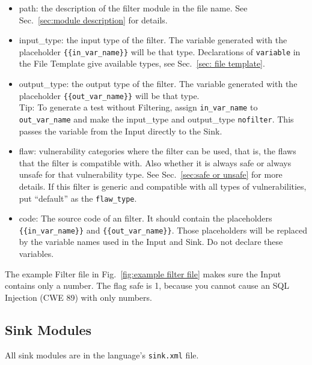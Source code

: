 \documentclass[12pt]{article}
\begin{document}
\begin{itemize}
    \item path: the description of the filter module in the file name.
      See Sec.~\ref{sec:module description} for details.
    
    \item input\_type: the input type of the filter. The variable 
    generated with
    the placeholder \verb|{{in_var_name}}| will be that type.
    Declarations of \verb|variable| in the File Template give
    available types, see Sec.~\ref{sec: file template}.

    \item output\_type: the output type of the filter.  The variable generated
    with the placeholder \verb|{{out_var_name}}| will be that type. \\
    Tip: To generate a test without Filtering, assign \verb|in_var_name| to
    \verb|out_var_name| and make the input\_type and output\_type \verb|nofilter|.
    This passes the variable from the Input directly to the Sink.

    \item flaw: vulnerability categories where the filter can be used, that is, the
      flaws that the filter is compatible with.  Also whether it is always safe or
      always unsafe for that vulnerability type.  See Sec.~\ref{sec:safe or unsafe}
      for more details.  If this filter is generic and compatible with all
      types of vulnerabilities, put ``default'' as the \verb|flaw_type|.

    \item code: The source code of an filter. It should contain the placeholders
    \\
    \verb|{{in_var_name}}| and \verb|{{out_var_name}}|.  Those placeholders will 
    be replaced by the variable names used in the Input and Sink.  Do not declare 
    these variables.
\end{itemize}

The example Filter file in Fig.~\ref{fig:example filter file} makes sure
the Input contains only a number.  
The flag safe is 1, because you cannot cause an SQL Injection 
(CWE 89) with only numbers.


\subsection{Sink Modules}
\label{sec:sink modules}

All sink modules are in the language's \verb|sink.xml| file.
\end{document}
